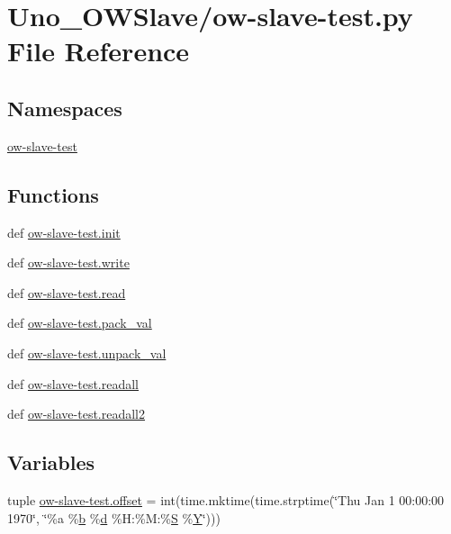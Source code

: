 \hypertarget{ow-slave-test_8py}{\section{Uno\-\_\-\-O\-W\-Slave/ow-\/slave-\/test.py File Reference}
\label{ow-slave-test_8py}
}
\subsection*{Namespaces}
\begin{DoxyCompactItemize}
\item 
\hyperlink{namespaceow-slave-test}{ow-\/slave-\/test}
\end{DoxyCompactItemize}
\subsection*{Functions}
\begin{DoxyCompactItemize}
\item 
def \hyperlink{namespaceow-slave-test_ab091aabaec0d431fbd8f2966c4ad2b34}{ow-\/slave-\/test.\-init}
\item 
def \hyperlink{namespaceow-slave-test_a6208e9fac4a2985c7004148f0c6f3a0b}{ow-\/slave-\/test.\-write}
\item 
def \hyperlink{namespaceow-slave-test_a91854caa9cb46af512a1868311c2eb26}{ow-\/slave-\/test.\-read}
\item 
def \hyperlink{namespaceow-slave-test_a64b1d041927699889619c1d9164a23b4}{ow-\/slave-\/test.\-pack\-\_\-val}
\item 
def \hyperlink{namespaceow-slave-test_ac894ce4758d4c4841f29c609063bf5a2}{ow-\/slave-\/test.\-unpack\-\_\-val}
\item 
def \hyperlink{namespaceow-slave-test_a84f5a1017b72cca872e223e58758e94f}{ow-\/slave-\/test.\-readall}
\item 
def \hyperlink{namespaceow-slave-test_a7c6f6e730ee5db6816886742e49355b5}{ow-\/slave-\/test.\-readall2}
\end{DoxyCompactItemize}
\subsection*{Variables}
\begin{DoxyCompactItemize}
\item 
tuple \hyperlink{namespaceow-slave-test_aabcf0d09fb3ab10a273d0b662db302c3}{ow-\/slave-\/test.\-offset} = int(time.\-mktime(time.\-strptime(\char`\"{}Thu Jan 1 00\-:00\-:00 1970\char`\"{}, \char`\"{}\%a \%\hyperlink{IMU_8cpp_a20f3a6e8a2ba2537edf801801628417b}{b} \%\hyperlink{OWGeneric__DangerShield_8ino_a22871ee78191bcd7676a38358795104e}{d} \%H\-:\%M\-:\%\hyperlink{md5_8c_a5a9675d71aad8449f8e4112ce611fd93}{S} \%\hyperlink{OWGeneric__SensorStation_8ino_ac915220fb659eb2c5958a1ccd81b80d4}{Y}\char`\"{})))
\end{DoxyCompactItemize}
